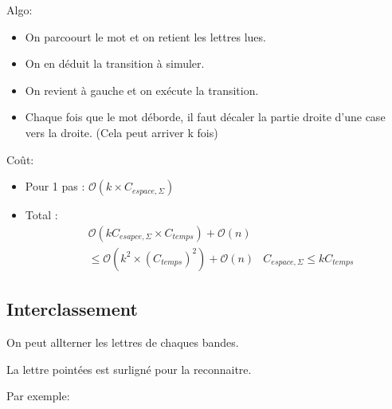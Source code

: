 \documentclass{article}
\theoremstyle{plain}
\theoremstyle{nonumberplain}
\begin{document}
  Algo: 

  \begin{itemize}
    
    \item On parcoourt le mot et on retient les lettres lues. 

    \item On en déduit la transition à simuler.

    \item On revient à gauche et on exécute la transition. 

    \item Chaque fois que le mot déborde, il faut décaler 
          la partie droite d'une case vers la droite. (Cela peut arriver k fois)
  \end{itemize}

  Coût: \begin{itemize}
    \item Pour 1 pas : $\mathcal{O}(k \times C_{espace, \Sigma})$

    \item Total : \begin{align*}
        & \mathcal{O}(k C_{esapce, \Sigma} \times C_{temps}) + \mathcal{O}(n) \\
        & \leq \mathcal{O}(k^2 \times (C_{temps})^2) + \mathcal{O}(n)     
        & C_{espace, \Sigma} \leq k C_{temps}
    \end{align*}
  \end{itemize}

\subsection{Interclassement}

  On peut allterner les lettres de chaques bandes.

  La lettre pointées est surligné pour la reconnaitre.

  Par exemple:
\end{document}
